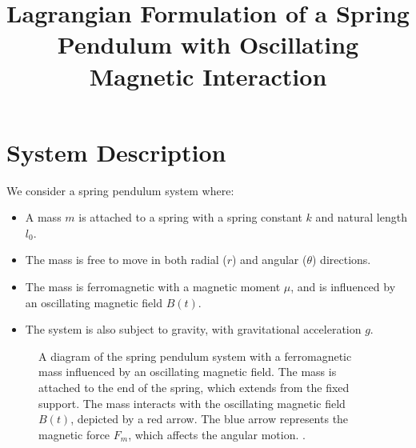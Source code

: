 \documentclass[12pt]{article}
\title{Lagrangian Formulation of a Spring Pendulum with Oscillating Magnetic Interaction}
\author{}
\date{}
\begin{document}
\maketitle
\tableofcontents
\newpage
\section{System Description}
We consider a spring pendulum system where:
\begin{itemize}
    \item A mass \( m \) is attached to a spring with a spring constant \( k \) and natural length \( l_0 \).
    \item The mass is free to move in both radial (\( r \)) and angular (\( \theta \)) directions.
    \item The mass is ferromagnetic with a magnetic moment \( \mu \), and is influenced by an oscillating magnetic field \( B(t) \).
    \item The system is also subject to gravity, with gravitational acceleration \( g \).
\end{itemize}

\begin{figure}[h!]
\centering
{}
\caption{A diagram of the spring pendulum system with a ferromagnetic mass influenced by an oscillating magnetic field. The mass is attached to the end of the spring, which extends from the fixed support. The mass interacts with the oscillating magnetic field \( B(t) \), depicted by a red arrow. The blue arrow represents the magnetic force \( F_m \), which affects the angular motion. .}
\label{fig:spring_pendulum}
\end{figure}
\end{document}
